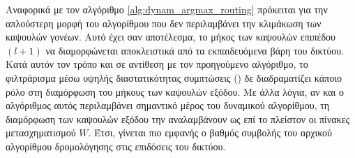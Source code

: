 
Αναφορικά με τον αλγόριθμο \ref{alg:dynam_argmax_routing} πρόκειται για την απλούστερη μορφή του αλγορίθμου  που δεν περιλαμβάνει την κλιμάκωση των καψουλών γονέων. Αυτό έχει σαν αποτέλεσμα, το μήκος των καψουλών επιπέδου $(l+1)$ να διαμορφώνεται αποκλειστικά από τα εκπαιδευόμενα βάρη του δικτύου. Κατά αυτόν τον τρόπο και σε αντίθεση με τον προηγούμενο αλγόριθμο, το φιλτράρισμα μέσω υψηλής διαστατικότητας συμπτώσεις () δε διαδραματίζει κάποιο ρόλο στη διαμόρφωση του μήκους των καψουλών εξόδου. Με άλλα λόγια, αν και ο αλγόριθμος αυτός περιλαμβάνει σημαντικό μέρος του δυναμικού αλγορίθμου, τη διαμόρφωση των καψουλών εξόδου την αναλαμβάνουν ως επί το πλείστον οι πίνακες μετασχηματισμού $W$. Έτσι, γίνεται πιο εμφανής ο βαθμός συμβολής του αρχικού αλγορίθμου δρομολόγησης στις επιδόσεις του δικτύου.

